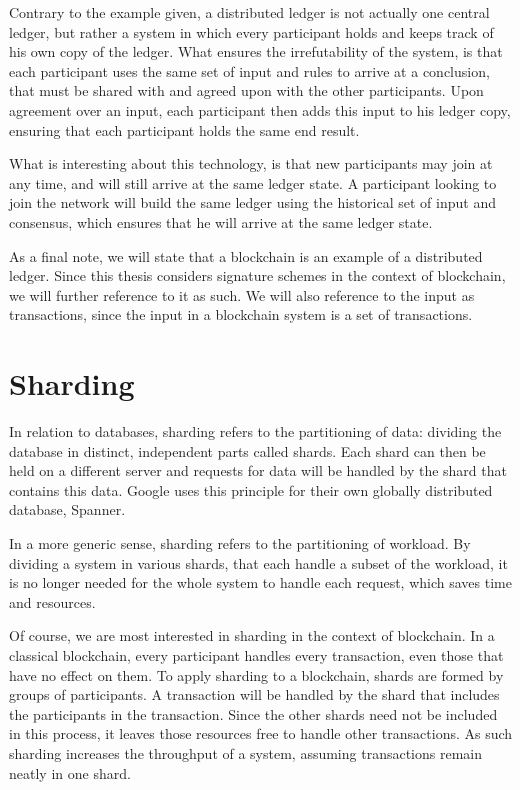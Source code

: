 \documentclass[12pt]{report}
\theoremstyle{plain}
\theoremstyle{definition}
\begin{document}
	Contrary to the example given, a distributed ledger is not actually one central ledger, but rather a system in which every participant holds and keeps track of his own copy of the ledger. What ensures the irrefutability of the system, is that each participant uses the same set of input and rules to arrive at a conclusion, that must be shared with and agreed upon with the other participants.
	Upon agreement over an input, each participant then adds this input to his ledger copy, ensuring that each participant holds the same end result.
	
	What is interesting about this technology, is that new participants may join at any time, and will still arrive at the same ledger state. A participant looking to join the network will build the same ledger using the historical set of input and consensus, which ensures that he will arrive at the same ledger state.\cite{distributedledger}
	
	As a final note, we will state that a blockchain is an example of a distributed ledger. Since this thesis considers signature schemes in the context of blockchain, we will further reference to it as such. We will also reference to the input as transactions, since the input in a blockchain system is a set of transactions.
	\section{Sharding}	
	In relation to databases, sharding refers to the partitioning of data: dividing the database in distinct, independent parts called shards. Each shard can then be held on a different server and requests for data will be handled by the shard that contains this data. Google uses this principle for their own globally distributed database, Spanner.\cite{spanner}
	
	In a more generic sense, sharding refers to the partitioning of workload. By dividing a system in various shards, that each handle a subset of the workload, it is no longer needed for the whole system to handle each request, which saves time and resources.
	
	Of course, we are most interested in sharding in the context of blockchain. In a classical blockchain, every participant handles every transaction, even those that have no effect on them. To apply sharding to a blockchain, shards are formed by groups of participants.
	A transaction will be handled by the shard that includes the participants in the transaction. Since the other shards need not be included in this process, it leaves those resources free to handle other transactions. As such sharding increases the throughput of a system, assuming transactions remain neatly in one shard.
	
\end{document}
